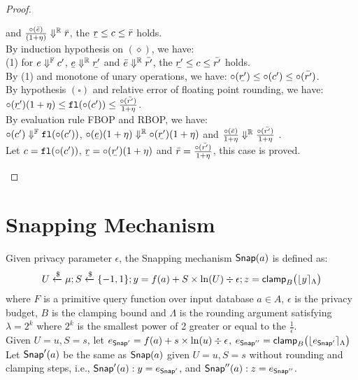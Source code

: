 \documentclass[a4paper,11pt]{article}
\begin{document}
\begin{proof}
\begin{itemize}
\begin{itemize}
	and $\frac{\circ(\bar{e})}{(1 + \eta)} \Downarrow^{\mathbb{R}} \bar{r}$,
	the $\ubar{\rval} \leq \fval \leq \bar{\rval}$ holds.\\
	By induction hypothesis on $(\diamond)$, we have:\\
	(1) for $e \Downarrow^{\mathbb{F}} c'$, 
	$\ubar{\expr} \rbigstep \ubar{\rval'}$ 
	and $\bar{e} \Downarrow^{\mathbb{R}} \bar{r'}$,
	the $\ubar{\rval'} \leq \fval \leq \bar{\rval'}$ holds.\\
	By (1) and monotone of unary operations, we have:
	$\uop(\ubar{\rval'})
	\leq \uop(\fval')
	\leq \uop(\bar{\rval'})$.\\
	By hypothesis $(\square)$ and relative error of floating point rounding, we have:\\
	$\uop(\ubar{\rval'})(1 + \eta)
	\leq \floaten(\uop(\fval'))
	\leq \frac{\uop(\bar{\rval'})}{1 + \eta}$.\\
	By evaluation rule FBOP and RBOP, we have:\\
	$\circ(c') \Downarrow^{\mathbb{F}} \mathtt{fl}(\circ(c'))$, 
	$\uop(\ubar{\expr})(1 + \eta) 
	\rbigstep \uop(\ubar{\rval'})(1 + \eta)$
	and $\frac{\circ(\bar{e})}{1 + \eta} 
	\Downarrow^{\mathbb{R}} \frac{\circ(\bar{r'})}{1 + \eta}$ .\\
	Let $c = \mathtt{fl}(\circ(c'))$,
	$\ubar{\rval} = \uop(\ubar{\rval'})(1 + \eta)$ and $\bar{r} = \frac{\circ(\bar{r'})}{1 + \eta}$, this case is proved.
	\end{itemize}
\end{itemize}
%
\end{proof}

\newpage
\section{Snapping Mechanism}

\begin{defn}
Given privacy parameter $\epsilon$, the Snapping mechanism $\mathsf{Snap}(a)$ is defined as:
\[
	U \xleftarrow{\$} \mu; S \xleftarrow{\$} \{-1, 1\};
	y = f(a) + S \times \ln (U) \div \epsilon;
	z = \mathsf{clamp}_B \big(
	\lfloor y \rceil_{\Lambda}
	\big)
\]
where $F$ is a primitive query function over input database $a \in A$, $\epsilon$ is the privacy budget, $B$ is the clamping bound and $\Lambda$ is the rounding argument satisfying $\lambda = 2^k$ where $2^k$ is the smallest power of 2 greater or equal to the $\frac{1}{\epsilon}$.
%
\\
%
Given $U = u, S = s$, let $e_{\mathsf{Snap}'} = f(a) + s \times \ln (u) \div \epsilon$,
$e_{\mathsf{Snap}''} = \mathsf{clamp}_B \big( \lfloor e_{\mathsf{Snap}'}  \rceil_{\Lambda} \big)$
%
\\
%
Let $\mathsf{Snap}'(a)$ be the same as $\mathsf{Snap}(a)$ given $U = u, S = s$ without rounding and clamping steps, i.e., $\mathsf{Snap}'(a): y = e_{\mathsf{Snap}'}$,
and $\mathsf{Snap}''(a): z = e_{\mathsf{Snap}''}$.
\end{defn}
\end{document}
